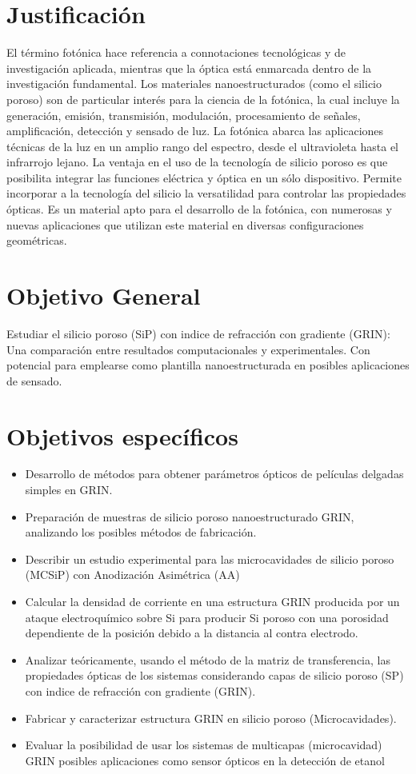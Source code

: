 \documentclass[a4paper,11pt,]{book}
\begin{document}
 \section{Justificación } 
El término fotónica hace referencia a connotaciones tecnológicas y de investigación aplicada, mientras que la óptica está enmarcada dentro de la investigación fundamental. Los materiales nanoestructurados (como el silicio poroso) son de particular interés para la ciencia de la fotónica, la cual incluye la generación, emisión, transmisión, modulación, procesamiento de señales, amplificación, detección y sensado de luz. La fotónica abarca las aplicaciones técnicas de la luz en un amplio rango del espectro, desde el ultravioleta hasta el infrarrojo lejano. La ventaja en el uso de la tecnología de silicio poroso es que posibilita integrar las funciones eléctrica y óptica en un sólo dispositivo. Permite incorporar a la tecnología del silicio la versatilidad para controlar las propiedades ópticas. Es un material apto para el desarrollo de la fotónica, con numerosas y nuevas aplicaciones que utilizan este material en diversas configuraciones geométricas. 
 \section{Objetivo General}  
Estudiar el  silicio poroso (SiP) con indice de refracción con gradiente (GRIN): Una comparación entre resultados computacionales y experimentales. Con potencial para emplearse como plantilla nanoestructurada en posibles aplicaciones de sensado.

  \section{Objetivos específicos} 
  \begin{itemize}
     \item	Desarrollo de métodos para obtener parámetros ópticos de películas delgadas simples en GRIN.
  	 \item Preparación de muestras de silicio poroso nanoestructurado GRIN, analizando los posibles métodos de
  	fabricación.
  	\item Describir un estudio  experimental para las  microcavidades de silicio poroso (MCSiP)  con Anodización Asimétrica (AA)
  	\item Calcular  la densidad de corriente en una estructura GRIN producida por un ataque electroquímico sobre Si para producir Si poroso con una porosidad dependiente de la posición debido a la distancia al contra electrodo. 
  	\item Analizar teóricamente, usando el método de la matriz de transferencia, las propiedades ópticas de los sistemas considerando capas de silicio poroso (SP) con indice de refracción con gradiente (GRIN).
  	\item Fabricar y caracterizar estructura GRIN en silicio poroso (Microcavidades). 
  	\item Evaluar la posibilidad de usar los sistemas de multicapas (microcavidad) GRIN	posibles aplicaciones como sensor ópticos en la detección de etanol
  	
  \end{itemize} 
\end{document}
